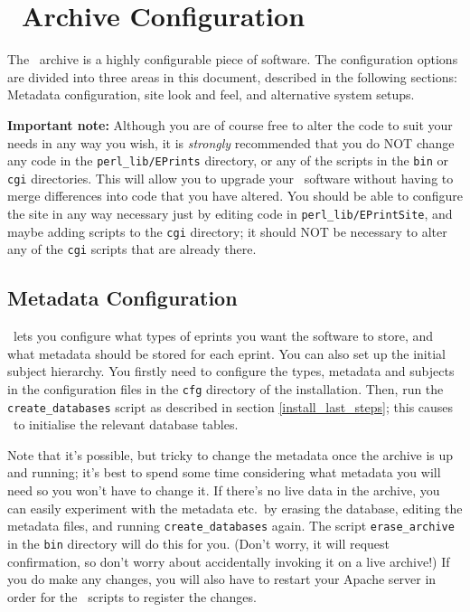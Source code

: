 \section{\eprints\ Archive Configuration}
\label{install_configure}

The \eprints\ archive is a highly configurable piece of software. The configuration options are divided into three areas in this document, described in the following sections: Metadata configuration, site look and feel, and alternative system setups.

{\bf Important note:} Although you are of course free to alter the code to suit your needs in any way you wish, it is \emph{strongly} recommended that you do NOT change any code in the {\tt perl\_lib/EPrints} directory, or any of the scripts in the {\tt bin} or {\tt cgi} directories. This will allow you to upgrade your \eprints\ software without having to merge differences into code that you have altered. You should be able to configure the site in any way necessary just by editing code in {\tt perl\_lib/EPrintSite}, and maybe adding scripts to the {\tt cgi} directory; it should NOT be necessary to alter any of the {\tt cgi} scripts that are already there.


\subsection{Metadata Configuration}
\label{install_metadata}

\eprints\ lets you configure what types of eprints you want the software to store, and what metadata should be stored for each eprint. You can also set up the initial subject hierarchy. You firstly need to configure the types, metadata and subjects in the configuration files in the {\tt cfg} directory of the installation. Then, run the {\tt create\_databases} script as described in section \ref{install_last_steps}; this causes \eprints\ to initialise the relevant database tables.

Note that it's possible, but tricky to change the metadata once the archive is up and running; it's best to spend some time considering what metadata you will need so you won't have to change it. If there's no live data in the archive, you can easily experiment with the metadata etc.\ by erasing the database, editing the metadata files, and running {\tt create\_databases} again. The script {\tt erase\_archive} in the {\tt bin} directory will do this for you. (Don't worry, it will request confirmation, so don't worry about accidentally invoking it on a live archive!) If you do make any changes, you will also have to restart your Apache server in order for the \eprints\ scripts to register the changes.

